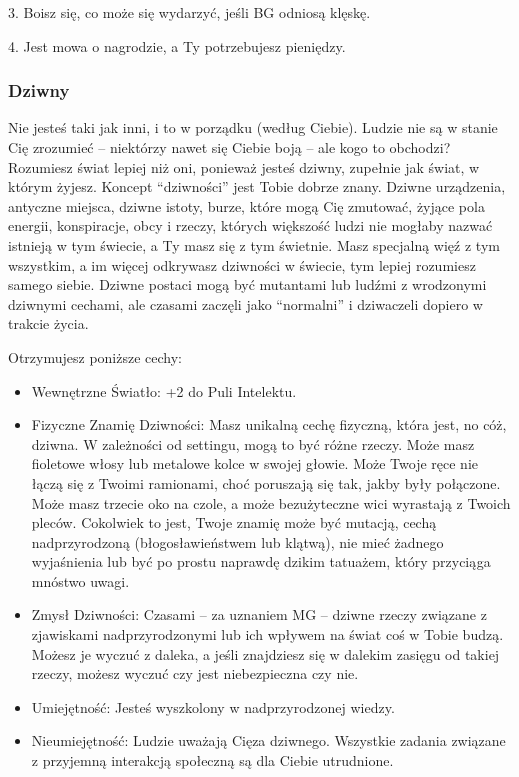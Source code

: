 3. Boisz się, co może się wydarzyć, jeśli BG odniosą klęskę.

4. Jest mowa o nagrodzie, a Ty potrzebujesz pieniędzy.

\subsubsection{Dziwny}

Nie jesteś taki jak inni, i to w porządku (według Ciebie). Ludzie nie są w stanie Cię zrozumieć – niektórzy nawet się Ciebie boją – ale kogo to obchodzi? Rozumiesz świat lepiej niż oni, ponieważ jesteś dziwny, zupełnie jak świat, w którym żyjesz. Koncept “dziwności” jest Tobie dobrze znany. Dziwne urządzenia, antyczne miejsca, dziwne istoty, burze, które mogą Cię zmutować, żyjące pola energii, konspiracje, obcy i rzeczy, których większość ludzi nie mogłaby nazwać istnieją w tym świecie, a Ty masz się z tym świetnie. Masz specjalną więź z tym wszystkim, a im więcej odkrywasz dziwności w świecie, tym lepiej rozumiesz samego siebie. Dziwne postaci mogą być mutantami lub ludźmi z wrodzonymi dziwnymi cechami, ale czasami zaczęli jako “normalni” i dziwaczeli dopiero w trakcie życia.

Otrzymujesz poniższe cechy:
\begin{itemize}
\item Wewnętrzne Światło: +2 do Puli Intelektu.
\item Fizyczne Znamię Dziwności: Masz unikalną cechę fizyczną, która jest, no cóż, dziwna. W zależności od settingu, mogą to być różne rzeczy. Może masz fioletowe włosy lub metalowe kolce w swojej głowie. Może Twoje ręce nie łączą się z Twoimi ramionami, choć poruszają się tak, jakby były połączone. Może masz trzecie oko na czole, a może bezużyteczne wici wyrastają z Twoich pleców. Cokolwiek to jest, Twoje znamię może być mutacją, cechą nadprzyrodzoną (błogosławieństwem lub klątwą), nie mieć żadnego wyjaśnienia lub być po prostu naprawdę dzikim tatuażem, który przyciąga mnóstwo uwagi.
\item Zmysł Dziwności: Czasami – za uznaniem MG – dziwne rzeczy związane z zjawiskami nadprzyrodzonymi lub ich wpływem na świat coś w Tobie budzą. Możesz je wyczuć z daleka, a jeśli znajdziesz się w dalekim zasięgu od takiej rzeczy, możesz wyczuć czy jest niebezpieczna czy nie.
\item Umiejętność: Jesteś wyszkolony w nadprzyrodzonej wiedzy.
 \item Nieumiejętność: Ludzie uważają Cięza dziwnego. Wszystkie zadania związane z przyjemną interakcją społeczną są dla Ciebie utrudnione.
\end{itemize}
    
